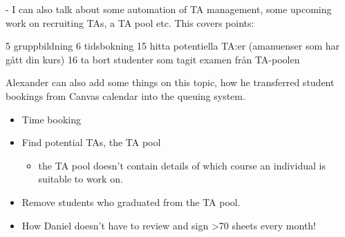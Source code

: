 - I can also talk about some automation of TA management, some upcoming
work on recruiting TAs, a TA pool etc. This covers points:

5 gruppbildning
6 tidsbokning
15 hitta potentiella TA:er (amanuenser som har gått din kurs)
16 ta bort studenter som tagit examen från TA-poolen


Alexander can also add some things on this topic, how he transferred
student bookings from Canvas calendar into the queuing system.

\begin{frame}[fragile]\label<2>{WishTA}
  \begin{example}
    \begin{itemize}
      \item \alert{Time booking}

      \item \alert{Find potential TAs, the TA pool}
        \begin{itemize}
          \item the TA pool doesn't contain details of which course an 
            individual is suitable to work on.
        \end{itemize}

      \item \alert{Remove students who graduated from the TA pool.}
    \end{itemize}
  \end{example}

  \pause

  \begin{example}[Bonus!]
   \begin{itemize}
     \item How Daniel doesn't have to review and sign >70 sheets every month!
   \end{itemize} \end{example}
\end{frame}

